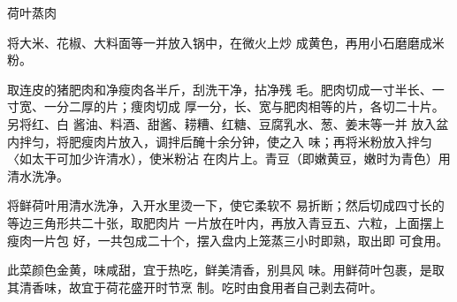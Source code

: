 \begin{recipe}{荷叶蒸肉}

\ingredients


\cooking

\step 将大米、花椒、大料面等一并放入锅中，在微火上炒 成黄色，再用小石磨磨成米粉。

\step 取连皮的猪肥肉和净瘦肉各半斤，刮洗干净，拈净残 毛。肥肉切成一寸半长、一寸宽、一分二厚的片；痩肉切成 厚一分，长、宽与肥肉相等的片，各切二十片。另将红、白 酱油、料酒、甜酱、耢糟、红糖、豆腐乳水、葱、姜末等一并 放入盆内拌匀，将肥瘦肉片放入，调拌后醃十余分钟，使之入 味；再将米粉放入拌匀〈如太干可加少许清水），使米粉沾 在肉片上。青豆（即嫩黄豆，嫩时为青色）用清水洗净。

\step 将鲜荷叶用清水洗净，入开水里烫一下，使它柔软不 易折断；然后切成四寸长的等边三角形共二十张，取肥肉片 一片放在叶内，再放入青豆五、六粒，上面摆上瘦肉一片包 好，一共包成二十个，摆入盘内上笼蒸三小时即熟，取出即 可食用。

\notes

此菜颜色金黄，味咸甜，宜于热吃，鲜美清香，别具风 味。用鲜荷叶包裹，是取其清香味，故宜于荷花盛开时节烹 制。吃时由食用者自己剥去荷叶。

\end{recipe}

